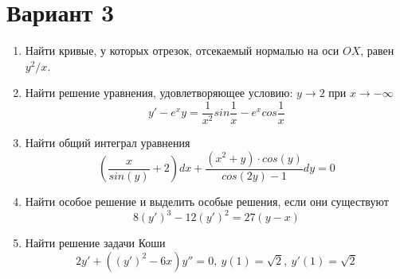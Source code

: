 \documentclass[a4paper]{article}
\begin{document}
\section*{\centering Вариант 3}

\begin{enumerate}
    \item Найти кривые, у которых отрезок, отсекаемый нормалью на оси $OX$, равен $y^2 / x$.
    \item Найти решение уравнения, удовлетворяющее условию: $y \rightarrow 2$ при $x \rightarrow -\infty$
    $$
        y' - e^xy = \dfrac{1}{x^2}sin\dfrac{1}{x} - e^x cos\dfrac{1}{x}
    $$
    \item Найти общий интеграл уравнения
    $$
        \left(\dfrac{x}{sin(y)} + 2\right)dx + \dfrac{(x^2 + y) \cdot cos(y)}{cos(2y) - 1}dy = 0
    $$
    \item Найти особое решение и выделить особые решения, если они существуют
    $$
        8(y')^3 - 12(y')^2 = 27(y - x)
    $$
    \item Найти решение задачи Коши
    $$
        2y' + ((y')^2 - 6x)y'' = 0,\ y(1) = \sqrt{2},\ y'(1) = \sqrt{2}
    $$
\end{enumerate}
\end{document}
